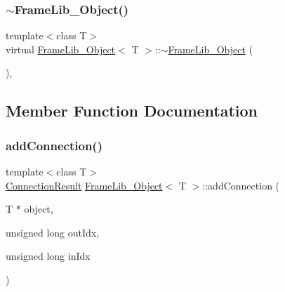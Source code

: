 \mbox{\label{class_frame_lib___object_ab88bcc3fe9e1c9da41a4afebb3d05005}} 
\subsubsection{\texorpdfstring{$\sim$\+Frame\+Lib\+\_\+\+Object()}{~FrameLib\_Object()}}
{\footnotesize\ttfamily template$<$class T$>$ \\
virtual \hyperlink{class_frame_lib___object}{Frame\+Lib\+\_\+\+Object}$<$ T $>$\+::$\sim$\hyperlink{class_frame_lib___object}{Frame\+Lib\+\_\+\+Object} (\begin{DoxyParamCaption}{ }\end{DoxyParamCaption})\hspace{0.3cm}{\ttfamily [inline]}, {\ttfamily [virtual]}}



\subsection{Member Function Documentation}
\mbox{\label{class_frame_lib___object_a216a018651f08f5779d40fd243921527}} 
\subsubsection{\texorpdfstring{add\+Connection()}{addConnection()}}
{\footnotesize\ttfamily template$<$class T$>$ \\
\hyperlink{_frame_lib___types_8h_a2a427ca8c6f961bac8e41f6edecf0722}{Connection\+Result} \hyperlink{class_frame_lib___object}{Frame\+Lib\+\_\+\+Object}$<$ T $>$\+::add\+Connection (\begin{DoxyParamCaption}\item[{T $\ast$}]{object,  }\item[{unsigned long}]{out\+Idx,  }\item[{unsigned long}]{in\+Idx }\end{DoxyParamCaption})\hspace{0.3cm}{\ttfamily [inline]}}

